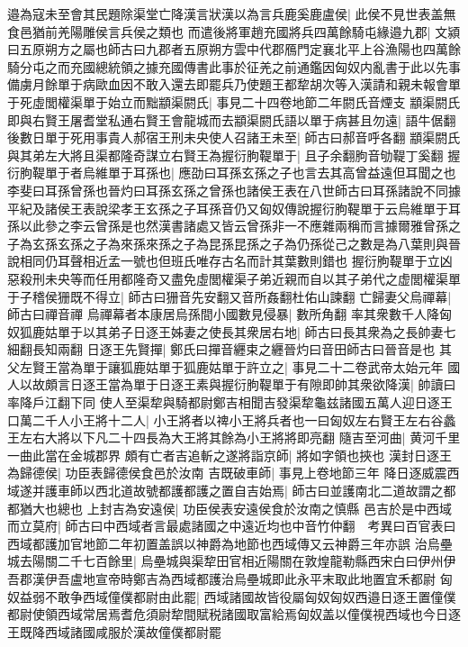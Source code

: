 邉為寇未至會其民題除渠堂亡降漢言狀漢以為言兵鹿奚鹿盧侯|{
	此侯不見世表盖無食邑猶前羌陽雕侯言兵侯之類也}
而遣後將軍趙充國將兵四萬餘騎屯緣邉九郡|{
	文潁曰五原朔方之屬也師古曰九郡者五原朔方雲中代郡鴈門定襄北平上谷漁陽也四萬餘騎分屯之而充國總統領之據充國傳書此事於征羌之前通鑑因匈奴内亂書于此以先事}
備虜月餘單于病歐血因不敢入還去即罷兵乃使題王都犂胡次等入漢請和親未報會單于死虛閭權渠單于始立而黜顓渠閼氏|{
	事見二十四卷地節二年閼氏音煙支}
顓渠閼氏即與右賢王屠耆堂私通右賢王會龍城而去顓渠閼氏語以單于病甚且勿遠|{
	語牛倨翻}
後數日單于死用事貴人郝宿王刑未央使人召諸王未至|{
	師古曰郝音呼各翻}
顓渠閼氏與其弟左大將且渠都隆奇謀立右賢王為握衍朐鞮單于|{
	且子余翻朐音劬鞮丁奚翻}
握衍朐鞮單于者烏維單于耳孫也|{
	應劭曰耳孫玄孫之子也言去其高曾益遠但耳聞之也李斐曰耳孫曾孫也晉灼曰耳孫玄孫之曾孫也諸侯王表在八世師古曰耳孫諸說不同據平紀及諸侯王表說梁孝王玄孫之子耳孫音仍又匈奴傳說握衍朐鞮單于云烏維單于耳孫以此參之李云曾孫是也然漢書諸處又皆云曾孫非一不應雜兩稱而言據爾雅曾孫之子為玄孫玄孫之子為來孫來孫之子為昆孫昆孫之子為仍孫從己之數是為八葉則與晉說相同仍耳聲相近孟一號也但班氏唯存古名而計其葉數則錯也}
握衍朐鞮單于立凶惡殺刑未央等而任用都隆奇又盡免虛閭權渠子弟近親而自以其子弟代之虚閭權渠單于子稽侯㹪既不得立|{
	師古曰㹪音先安翻又音所姦翻杜佑山諫翻}
亡歸妻父烏禪幕|{
	師古曰禪音禪}
烏禪幕者本康居烏孫間小國數見侵暴|{
	數所角翻}
率其衆數千人降匈奴狐鹿姑單于以其弟子日逐王姊妻之使長其衆居右地|{
	師古曰長其衆為之長帥妻七細翻長知兩翻}
日逐王先賢撣|{
	鄭氏曰撣音纒束之纒晉灼曰音田師古曰晉音是也}
其父左賢王當為單于讓狐鹿姑單于狐鹿姑單于許立之|{
	事見二十二卷武帝太始元年}
國人以故頗言日逐王當為單于日逐王素與握衍朐鞮單于有隙即帥其衆欲降漢|{
	帥讀曰率降戶江翻下同}
使人至渠犂與騎都尉鄭吉相聞吉發渠犂龜兹諸國五萬人迎日逐王口萬二千人小王將十二人|{
	小王將者以禆小王將兵者也一曰匈奴左右賢王左右谷蠡王左右大將以下凡二十四長為大王將其餘為小王將將即亮翻}
隨吉至河曲|{
	黄河千里一曲此當在金城郡界}
頗有亡者吉追斬之遂將詣京師|{
	將如字領也挾也}
漢封日逐王為歸德侯|{
	功臣表歸德侯食邑於汝南}
吉既破車師|{
	事見上卷地節三年}
降日逐威震西域遂并護車師以西北道故號都護都護之置自吉始焉|{
	師古曰並護南北二道故謂之都都猶大也總也}
上封吉為安遠侯|{
	功臣侯表安遠侯食於汝南之慎縣}
邑吉於是中西域而立莫府|{
	師古曰中西域者言最處諸國之中遠近均也中音竹仲翻　考異曰百官表曰西域都護加官地節二年初置盖誤以神爵為地節也西域傳又云神爵三年亦誤}
治烏壘城去陽關二千七百餘里|{
	烏壘城與渠犂田官相近陽關在敦煌龍勒縣西宋白曰伊州伊吾郡漢伊吾盧地宣帝時鄭吉為西域都護治烏壘城即此永平末取此地置宜禾都尉}
匈奴益弱不敢争西域僮僕都尉由此罷|{
	西域諸國故皆役屬匈奴匈奴西邉日逐王置僮僕都尉使領西域常居焉耆危須尉犂間賦税諸國取富給焉匈奴盖以僮僕視西域也今日逐王既降西域諸國咸服於漢故僮僕都尉罷}
